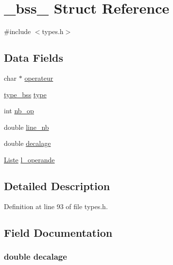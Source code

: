 \hypertarget{struct__bss__}{\section{\-\_\-bss\-\_\- Struct Reference}
\label{struct__bss__}
}


{\ttfamily \#include $<$types.\-h$>$}

\subsection*{Data Fields}
\begin{DoxyCompactItemize}
\item 
char $\ast$ \hyperlink{struct__bss___adc2a267b945f31e8e0dad4b528128cab}{operateur}
\item 
\hyperlink{types_8h_acb96c22a8f4234d82582857a216d04fc}{type\-\_\-bss} \hyperlink{struct__bss___aad08bab2b3236673ec49e299ca32a07e}{type}
\item 
int \hyperlink{struct__bss___a88a29c0db6a919d126d1c94d573dd711}{nb\-\_\-op}
\item 
double \hyperlink{struct__bss___a808a37180ef5a21555b2f0f68cf73cb6}{line\-\_\-nb}
\item 
double \hyperlink{struct__bss___aac945295366b3dadfd1ec0da01eb6cb8}{decalage}
\item 
\hyperlink{liste_8h_a5268448ae2a031c105e053d5ea682580}{Liste} \hyperlink{struct__bss___acdac487d99d10dba873a0f07707b220f}{l\-\_\-operande}
\end{DoxyCompactItemize}


\subsection{Detailed Description}


Definition at line 93 of file types.\-h.



\subsection{Field Documentation}
\hypertarget{struct__bss___aac945295366b3dadfd1ec0da01eb6cb8}{
\subsubsection[{decalage}]{\setlength{\rightskip}{0pt plus 5cm}double decalage}}\label{struct__bss___aac945295366b3dadfd1ec0da01eb6cb8}


